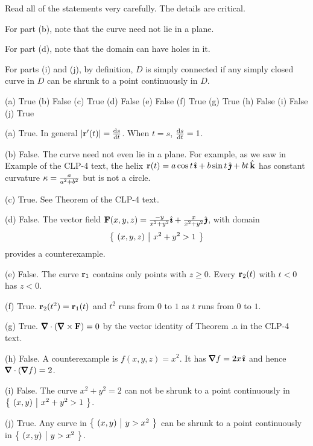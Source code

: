 \begin{hint} 
Read all of the statements very carefully. The details are critical.

For part (b), note that the curve need not lie in a plane.

For part (d), note that the domain can have holes in it.

For parts (i) and (j), by definition, $D$ is simply connected if 
any simply closed curve in $D$ can be shrunk to a 
point continuously in $D$.


\end{hint}

\begin{answer} 
(a) True\qquad
(b) False\qquad
(c) True\qquad
(d) False\qquad
(e) False\qquad
(f) True\qquad
(g) True\qquad
(h) False\qquad
(i) False\qquad
(j) True
\end{answer}

\begin{solution} 

(a) True. In general $|\vr'(t)| = \diff{s}{t}$. When $t=s$, $\diff{s}{t}=1$.

(b) False. The curve need not even lie in a plane. For example, as we
saw in Example  of the CLP-4 text, 
the helix $\mathbf{r}(t) = a\cos t\,\hat{\pmb{\imath}} +b\sin t\,\hat{\pmb{\jmath}} + bt\,\hat{\mathbf{k}}$ has constant 
curvature $\kappa=\frac{a}{a^2+b^2}$ but is not a circle.

(c) True. See Theorem  of the CLP-4 text.

(d) False. The vector field 
$
\mathbf{F}(x, y, z) = \frac{-y}{x^2+y^2} \hat{\pmb{\imath}} 
               + \frac{x}{x^2+y^2} \hat{\pmb{\jmath}}
$,
with domain 
\begin{equation*}
\big\{ \ (x,y,z)\ \big|\  x^2+y^2>1\ \big\}
\end{equation*} 
provides a counterexample.  

(e)  False. The curve $\mathbf{r}_1$ contains only points with $z\ge0$. 
Every $\mathbf{r}_2(t)$ with $t< 0$  has $z<0$.

(f) True. $\mathbf{r}_2(t^2)=\mathbf{r}_1(t)$ and $t^2$ runs from $0$ to $1$ as
$t$ runs from $0$ to $1$.

(g) True. $\vnabla\cdot(\vnabla\times \vF)=0$ by the vector identity
of Theorem .a in the CLP-4 text.

(h) False. A counterexample is $f(x,y,z) = x^2$. It has
     $\vnabla f = 2 x\,\hi$ and hence $\vnabla\cdot(\vnabla f) = 2$.


(i) False. The curve $x^2+y^2 = 2$ can not be shrunk to a 
point continuously in $\big\{ \  (x, y) \ \big|\  x^2 + y^2 > 1 \ \big\}$.

(j) True. Any curve in $\big\{ \  (x, y) \ \big|\  y > x^2  \ \big\}$ can be shrunk to a 
point continuously in $\big\{ \  (x, y) \ \big|\  y > x^2  \ \big\}$.

\end{solution}

